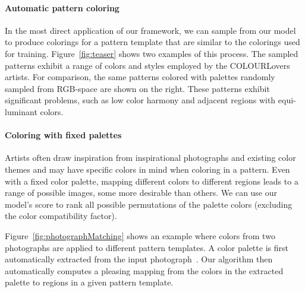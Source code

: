 \paragraph{Automatic pattern coloring} In the most direct application of our framework, we can sample from our model to produce colorings for a pattern template that are similar to the colorings used for training. Figure~\ref{fig:teaser} shows two examples of this process. The sampled patterns exhibit a range of colors and styles employed by the COLOURLovers artists. For comparison, the same patterns colored with palettes randomly sampled from RGB-space are shown on the right. These patterns exhibit significant problems, such as low color harmony and adjacent regions with equi-luminant colors.

\paragraph{Coloring with fixed palettes} 

Artists often draw inspiration from inspirational photographs and existing color themes and may have specific colors in mind when coloring in a pattern. Even with a fixed color palette, mapping different colors to different regions leads to a range of possible images, some more desirable than others. We can use our model's score to rank all possible permutations of the palette colors (excluding the color compatibility factor).

Figure~\ref{fig:photographMatching} shows an example where colors from two photographs are applied to different pattern templates. A color palette is first automatically extracted from the input photograph~\cite{SharonPaletteExtraction}. Our algorithm then automatically computes a pleasing mapping from the colors in the extracted palette to regions in a given pattern template.~ 

